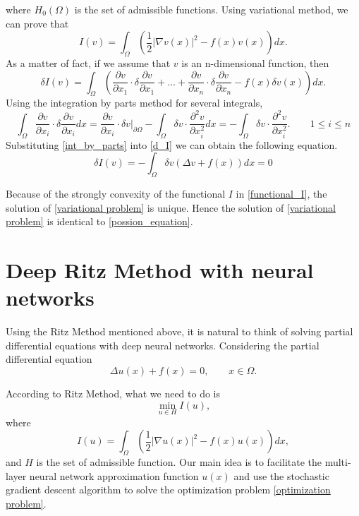 \documentclass{article}
\begin{document}
where $H_{0}(\Omega)$ is the set of admissible functions. Using variational method, we can prove that 
\begin{equation}\label{functional_I}
I(v)=\int_\Omega\left(\frac{1}{2}|\nabla v(x)|^2-f(x)v(x)\right)dx. 
\end{equation}
As a matter of fact, if we assume that $v$ is an n-dimensional function, then
\begin{equation}\label{d_I}
\delta I(v)=\int _{\Omega} \left(\frac{\partial v}{\partial x_1}\cdot \delta \frac{\partial v}{\partial x_1}+...+\frac{\partial v}{\partial x_n}\cdot   \delta \frac{\partial v}{\partial x_n}-f(x)\delta      v(x)   \right)dx.
\end{equation}
Using the integration by parts method for several integrals,
\begin{equation}\label{int_by_parts}
\int _{\Omega}\frac{\partial v}{\partial x_i}\cdot \delta \frac{\partial v}{\partial x_i} dx= \frac{\partial v}{\partial x_i}\cdot \delta v\Big|_{\partial \Omega}-\int_{\Omega}\delta v \cdot \frac{\partial^2 v}{\partial x_i ^2}dx=-\int_{\Omega}\delta v \cdot \frac{\partial^2 v}{\partial x_i ^2}. \qquad 1\le i\le n
\end{equation}
Substituting \eqref{int_by_parts} into \eqref{d_I} we can obtain the following equation.
\begin{equation}
\delta I(v)=-\int_{\Omega}\delta v(\Delta v+f(x))dx=0
\end{equation}
\par Because of the strongly convexity of the functional $I$ in \eqref{functional_I}, the solution of \eqref{variational problem} is unique. Hence the solution of \eqref{variational problem} is identical to \eqref{possion_equation}.

\section{Deep Ritz Method with neural networks}
\par Using the Ritz Method mentioned above, it is natural to think of solving partial differential equations with deep neural networks. Considering the partial differential equation
\begin{equation}
\Delta u(x)+f(x)=0,\qquad x\in \Omega.
\end {equation}
\par According to Ritz Method, what we need to do is
\begin{equation}\label{optimization problem}
\min\limits_{u\in H}{I(u)},
\end{equation}
where
\begin{equation}\label{I_equ}
I(u)=\int_\Omega\left(\frac{1}{2}|\nabla u(x)|^2-f(x)u(x)\right)dx,
\end{equation}
and $H$ is the set of admissible function. Our main idea is to facilitate the multi-layer neural network approximation function $u(x)$ and use the stochastic gradient descent algorithm to solve the optimization problem \eqref{optimization problem}.
\end{document}
